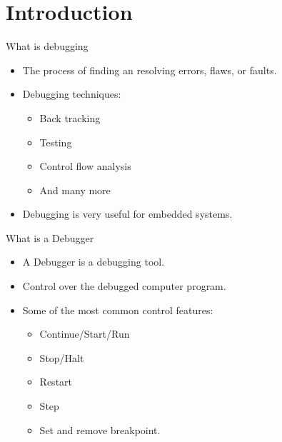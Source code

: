 \section{Introduction}

\begin{frame}{What is debugging}
    \begin{itemize}
        \item The process of finding an resolving errors, flaws, or faults.
        \item Debugging techniques:
    	\begin{itemize} %
    	    \item Back tracking
    	    \item Testing
    	    \item Control flow analysis
    	    \item And many more
    	\end{itemize}
        \item Debugging is very useful for embedded systems.
    \end{itemize}
\end{frame}


\begin{frame}{What is a Debugger}
    \begin{itemize}
        \item A Debugger is a debugging tool.
        \item Control over the debugged computer program.
        \item Some of the most common control features:
    	\begin{itemize}
    	    \item Continue/Start/Run
    	    \item Stop/Halt
    	    \item Restart
    	    \item Step
    	    \item Set and remove breakpoint.
    	\end{itemize}
    \end{itemize}
\end{frame}

